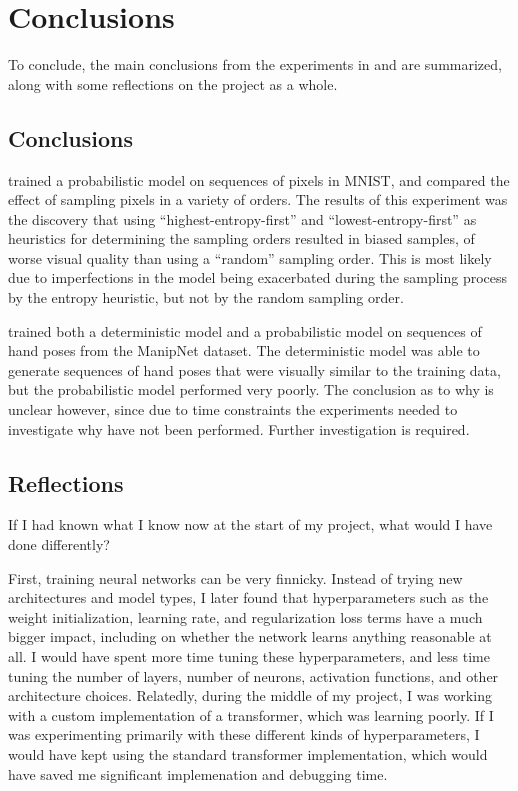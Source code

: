 \chapter{Conclusions}
\label{C:conclusion}

To conclude, the main conclusions from the experiments in  and  are summarized, along with some reflections on the project as a whole.

\section{Conclusions}

 trained a probabilistic model on sequences of pixels in MNIST, and compared the effect of sampling pixels in a variety of orders. The results of this experiment was the discovery that using ``highest-entropy-first'' and ``lowest-entropy-first'' as heuristics for determining the sampling orders resulted in biased samples, of worse visual quality than using a ``random'' sampling order. This is most likely due to imperfections in the model being exacerbated during the sampling process by the entropy heuristic, but not by the random sampling order.

 trained both a deterministic model and a probabilistic model on sequences of hand poses from the ManipNet dataset. The deterministic model was able to generate sequences of hand poses that were visually similar to the training data, but the probabilistic model performed very poorly. The conclusion as to why is unclear however, since due to time constraints the experiments needed to investigate why have not been performed. Further investigation is required.

\section{Reflections}

If I had known what I know now at the start of my project, what would I have done differently?

First, training neural networks can be very finnicky. Instead of trying new architectures and model types, I later found that hyperparameters such as the weight initialization, learning rate, and regularization loss terms have a much bigger impact, including on whether the network learns anything reasonable at all. I would have spent more time tuning these hyperparameters, and less time tuning the number of layers, number of neurons, activation functions, and other architecture choices. Relatedly, during the middle of my project, I was working with a custom implementation of a transformer, which was learning poorly. If I was experimenting primarily with these different kinds of hyperparameters, I would have kept using the standard transformer implementation, which would have saved me significant implemenation and debugging time.

